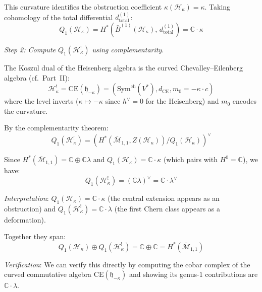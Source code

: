 \begin{example}
This curvature identifies the obstruction coefficient
$\kappa(\mathcal{H}_\kappa) = \kappa$.
Taking cohomology of the total differential
$d^{(1)}_{\mathrm{total}}$:
\begin{equation}
Q_1(\mathcal{H}_\kappa) = H^*(\bar{B}^{(1)}(\mathcal{H}_\kappa),\,
d^{(1)}_{\mathrm{total}}) = \mathbb{C} \cdot \kappa
\end{equation}

\emph{Step 2: Compute $Q_1(\mathcal{H}_\kappa^!)$ using complementarity}.

The Koszul dual of the Heisenberg algebra is the curved Chevalley--Eilenberg algebra (cf.\ Part~II):
\begin{equation}
\mathcal{H}_\kappa^! = \mathrm{CE}(\mathfrak{h}_{-\kappa}) = (\mathrm{Sym}^{\mathrm{ch}}(V^*), d_{\mathrm{CE}}, m_0 = -\kappa \cdot c)
\end{equation}
where the level inverts ($\kappa \mapsto -\kappa$ since $h^\vee = 0$ for the Heisenberg) and $m_0$ encodes the curvature.

By the complementarity theorem:
\begin{equation}
Q_1(\mathcal{H}_\kappa^!) = \left(H^*(\overline{\mathcal{M}}_{1,1}, Z(\mathcal{H}_\kappa)) 
/ Q_1(\mathcal{H}_\kappa)\right)^\vee
\end{equation}

Since $H^*(\overline{\mathcal{M}}_{1,1}) = \mathbb{C} \oplus \mathbb{C}\lambda$ and 
$Q_1(\mathcal{H}_\kappa) = \mathbb{C} \cdot \kappa$ (which pairs with $H^0 = \mathbb{C}$), 
we have:
\begin{equation}
Q_1(\mathcal{H}_\kappa^!) = (\mathbb{C}\lambda)^\vee = \mathbb{C} \cdot \lambda^\vee
\end{equation}

\emph{Interpretation}: $Q_1(\mathcal{H}_\kappa) = \mathbb{C} \cdot \kappa$ (the central extension appears as an obstruction) and $Q_1(\mathcal{H}_\kappa^!) = \mathbb{C} \cdot \lambda$ (the first Chern class appears as a deformation).

Together they span:
\begin{equation}
Q_1(\mathcal{H}_\kappa) \oplus Q_1(\mathcal{H}_\kappa^!) = \mathbb{C} \oplus \mathbb{C} 
= H^*(\overline{\mathcal{M}}_{1,1})
\end{equation}

\emph{Verification}: We can verify this directly by computing the cobar complex of
the curved commutative algebra $\mathrm{CE}(\mathfrak{h}_{-\kappa})$ and showing its genus-$1$ contributions are $\mathbb{C} \cdot \lambda$.
\end{example}

